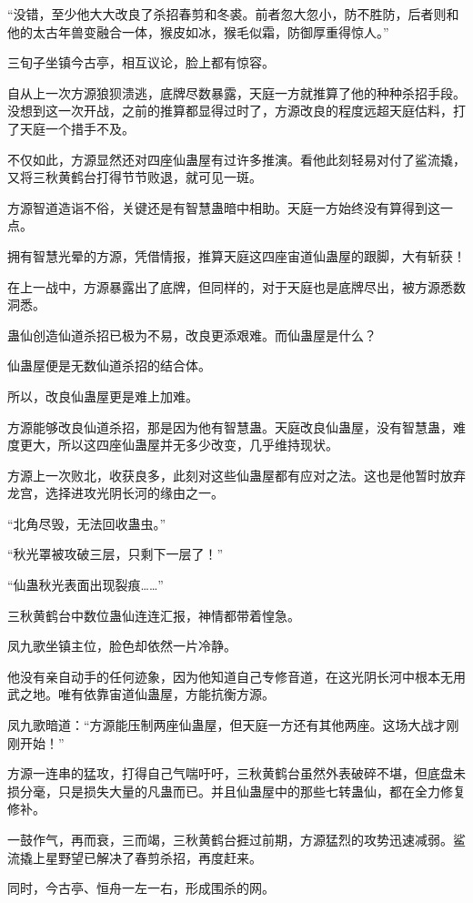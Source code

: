 \begin{this_body}
“没错，至少他大大改良了杀招春剪和冬裘。前者忽大忽小，防不胜防，后者则和他的太古年兽变融合一体，猴皮如冰，猴毛似霜，防御厚重得惊人。”

三旬子坐镇今古亭，相互议论，脸上都有惊容。

自从上一次方源狼狈溃逃，底牌尽数暴露，天庭一方就推算了他的种种杀招手段。没想到这一次开战，之前的推算都显得过时了，方源改良的程度远超天庭估料，打了天庭一个措手不及。

不仅如此，方源显然还对四座仙蛊屋有过许多推演。看他此刻轻易对付了鲨流撬，又将三秋黄鹤台打得节节败退，就可见一斑。

方源智道造诣不俗，关键还是有智慧蛊暗中相助。天庭一方始终没有算得到这一点。

拥有智慧光晕的方源，凭借情报，推算天庭这四座宙道仙蛊屋的跟脚，大有斩获！

在上一战中，方源暴露出了底牌，但同样的，对于天庭也是底牌尽出，被方源悉数洞悉。

蛊仙创造仙道杀招已极为不易，改良更添艰难。而仙蛊屋是什么？

仙蛊屋便是无数仙道杀招的结合体。

所以，改良仙蛊屋更是难上加难。

方源能够改良仙道杀招，那是因为他有智慧蛊。天庭改良仙蛊屋，没有智慧蛊，难度更大，所以这四座仙蛊屋并无多少改变，几乎维持现状。

方源上一次败北，收获良多，此刻对这些仙蛊屋都有应对之法。这也是他暂时放弃龙宫，选择进攻光阴长河的缘由之一。

“北角尽毁，无法回收蛊虫。”

“秋光罩被攻破三层，只剩下一层了！”

“仙蛊秋光表面出现裂痕……”

三秋黄鹤台中数位蛊仙连连汇报，神情都带着惶急。

凤九歌坐镇主位，脸色却依然一片冷静。

他没有亲自动手的任何迹象，因为他知道自己专修音道，在这光阴长河中根本无用武之地。唯有依靠宙道仙蛊屋，方能抗衡方源。

凤九歌暗道：“方源能压制两座仙蛊屋，但天庭一方还有其他两座。这场大战才刚刚开始！”

方源一连串的猛攻，打得自己气喘吁吁，三秋黄鹤台虽然外表破碎不堪，但底盘未损分毫，只是损失大量的凡蛊而已。并且仙蛊屋中的那些七转蛊仙，都在全力修复修补。

一鼓作气，再而衰，三而竭，三秋黄鹤台捱过前期，方源猛烈的攻势迅速减弱。鲨流撬上星野望已解决了春剪杀招，再度赶来。

同时，今古亭、恒舟一左一右，形成围杀的网。


\end{this_body}
